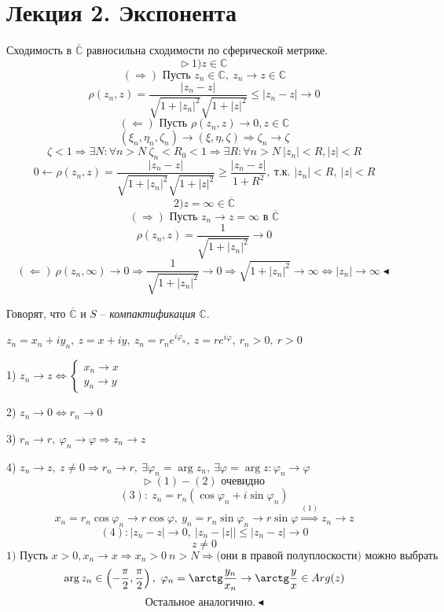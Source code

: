 
\section{Лекция 2. Экспонента}
 Сходимость в $\overline{\mathbb{C}}$ равносильна сходимости по сферической метрике.
\[\triangleright \ 1) z \in \mathbb{C}\]
\[(\Rightarrow) \text{ Пусть } z_n \in \mathbb{C}, \ z_n \to z \in \mathbb{C}\]
\[\rho(z_n, z) = \frac{|z_n-z|}{\sqrt{1+|z_n|^2}\sqrt{1+|z|^2}} \leq |z_n-z|\to 0\]
\[(\Leftarrow) \text{ Пусть } \rho(z_n, z) \to 0, z \in \mathbb{C}\]
\[(\xi_n, \eta_n, \zeta_n)\to(\xi, \eta, \zeta) \Rightarrow \zeta_n\to \zeta\]
\[\zeta < 1 \Rightarrow \exists N: \forall n > N \ \zeta_n < R_0 < 1 \Rightarrow \exists R: \forall n > N \ |z_n| < R, |z| < R\]
\[0 \leftarrow \rho(z_n, z) = \frac{|z_n-z|}{\sqrt{1+|z_n|^2}\sqrt{1+|z|^2}} \geq \frac{|z_n-z|}{1+R^2}, \ \text{т.к. } |z_n| < R, \ |z| < R\]
\[2) z = \infty \in \overline{\mathbb{C}}\]
\[(\Rightarrow) \text{ Пусть } z_n \to z = \infty \text{ в } \overline{\mathbb{C}}\]
\[\rho(z_n, z) = \frac{1}{\sqrt{1+|z_n|^2}} \to 0\]
\[(\Leftarrow) \ \rho(z_n, \infty) \to 0 \Rightarrow \frac{1}{\sqrt{1+|z_n|^2}} \to 0 \Rightarrow \sqrt{1+|z_n|^2} \to \infty \Leftrightarrow |z_n| \to \infty \blacktriangleleft\]

Говорят, что $\overline{\mathbb{C}}$ и $S$ -- \textit{компактификация} $\mathbb{C}$.

 $z_n = x_n +iy_n, \ z=x+iy, \ z_n = r_n e^{i\varphi_n}, \ z=re^{i\varphi}, \ r_n>0, \ r>0$

1) $z_n \to z \Leftrightarrow \begin{cases}
x_n \to x \\
y_n \to y   
\end{cases}$

2) $z_n \to 0 \Leftrightarrow r_n \to 0$ 

3) $r_n \to r, \ \varphi_n \to \varphi \Rightarrow z_n \to z$

4) $z_n \to z, \ z \neq 0 \Rightarrow r_n \to r, \ \exists \varphi_n = \arg z_n, \ \exists \varphi = \arg z: \varphi_n \to \varphi$
\[\triangleright \ (1)-(2) \text{ очевидно}\]
\[(3): \ z_n = r_n (\cos \varphi_n + i\sin \varphi_n)\] 
\[x_n = r_n \cos \varphi_n \to r\cos \varphi, \ y_n = r_n \sin \varphi_n \to r\sin \varphi \overset{(1)}{\Rightarrow} z_n \to z\]
\[(4): |z_n-z|\to 0, \ |z_n-|z|| \leq |z_n-z|\to 0\]
\[z \neq 0\]
\[\text{1) Пусть } x > 0, x_n\to x \Rightarrow x_n > 0 \ n > N \Rightarrow \text{(они в правой полуплоскости) можно выбрать } \]
\[\arg z_n \in \left(-\frac{\pi}{2}, \frac{\pi}{2}\right), \ \varphi_n = \arctg \frac{y_n}{x_n} \to \arctg \frac{y}{x} \in Arg(z)\]
\[\text{Остальное аналогично.} \ \blacktriangleleft\]

